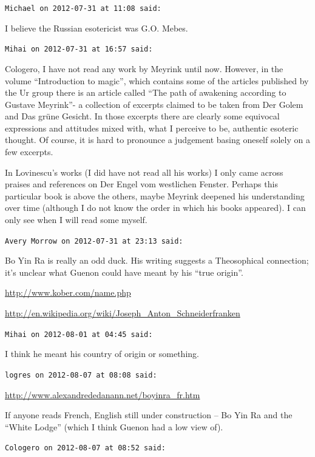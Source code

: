 \begin{footnotesize}
\begin{sffamily}
\hfill

\texttt{Michael on 2012-07-31 at 11:08 said: }

I believe the Russian esotericist was G.O. Mebes.


\hfill

\texttt{Mihai on 2012-07-31 at 16:57 said: }

Cologero, I have not read any work by Meyrink until now. However, in the volume “Introduction to magic”, which contains some of the articles published by the Ur group there is an article called “The path of awakening according to Gustave Meyrink”- a collection of excerpts claimed to be taken from Der Golem and Das grüne Gesicht. In those excerpts there are clearly some equivocal expressions and attitudes mixed with, what I perceive to be, authentic esoteric thought. Of course, it is hard to pronounce a judgement basing oneself solely on a few excerpts. 

In Lovinescu's works (I did have not read all his works) I only came across praises and references on Der Engel vom westlichen Fenster. Perhaps this particular book is above the others, maybe Meyrink deepened his understanding over time (although I do not know the order in which his books appeared). I can only see when I will read some myself.


\hfill

\texttt{Avery Morrow on 2012-07-31 at 23:13 said: }

Bo Yin Ra is really an odd duck. His writing suggests a Theosophical connection; it's unclear what Guenon could have meant by his “true origin”.

\url{http://www.kober.com/name.php}

\url{http://en.wikipedia.org/wiki/Joseph\_Anton\_Schneiderfranken}


\hfill

\texttt{Mihai on 2012-08-01 at 04:45 said: }

I think he meant his country of origin or something.


\hfill

\texttt{logres on 2012-08-07 at 08:08 said: }

\url{http://www.alexandrededanann.net/boyinra\_fr.htm}

If anyone reads French, English still under construction – Bo Yin Ra and the “White Lodge” (which I think Guenon had a low view of).


\hfill

\texttt{Cologero on 2012-08-07 at 08:52 said: }


\end{sffamily}
\end{footnotesize}
